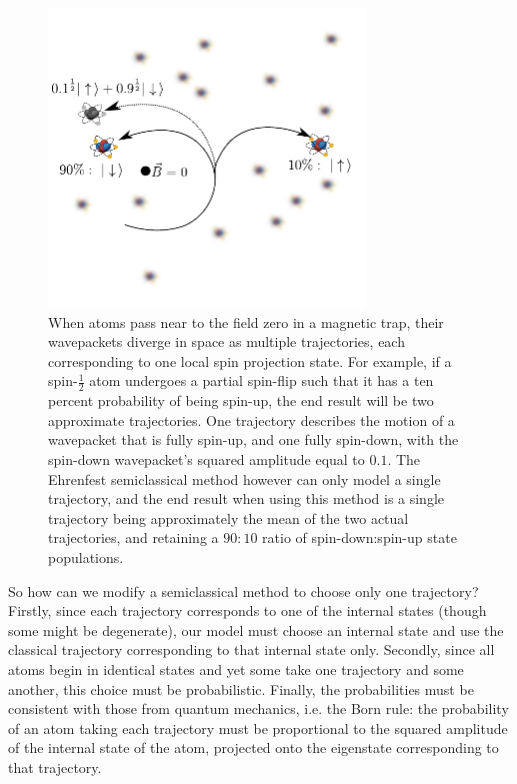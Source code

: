 \begin{figure}[t]
    \centerfloat
    \includegraphics[width=0.75\textwidth]{figures/hidden_variables/evap_problem.pdf}
    \caption{When atoms pass near to the field zero in a magnetic trap, their wavepackets diverge in space as multiple trajectories, each corresponding to one local spin projection state. For example, if a spin-$\frac12$ atom undergoes a partial spin-flip such that it has a ten percent probability of being spin-up, the end result will be two approximate trajectories. One trajectory describes the motion of a wavepacket that is fully spin-up, and one fully spin-down, with the spin-down wavepacket's squared amplitude equal to $0.1$. The Ehrenfest semiclassical method however can only model a single trajectory, and the end result when using this method is a single trajectory being approximately the mean of the two actual trajectories, and retaining a $90:10$ ratio of spin-down:spin-up state populations.}
    \label{fig:evap_problem}
\end{figure}

So how can we modify a semiclassical method to choose only one trajectory? Firstly, since each trajectory corresponds to one of the internal states (though some might be degenerate), our model must choose an internal state and use the classical trajectory corresponding to that internal state only. Secondly, since all atoms begin in identical states and yet some take one trajectory and some another, this choice must be probabilistic. Finally, the probabilities must be consistent with those from quantum mechanics, i.e. the Born rule: the probability of an atom taking each trajectory must be proportional to the squared amplitude of the internal state of the atom, projected onto the eigenstate corresponding to that trajectory.


